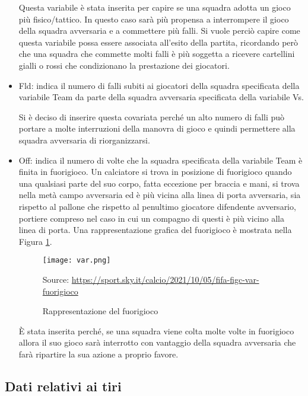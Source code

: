 \begin{itemize}
	Questa variabile è stata inserita per capire se una squadra adotta un gioco più fisico/tattico. In questo caso sarà più propensa a interrompere il gioco della squadra avversaria e a commettere più falli. Si vuole perciò capire come questa variabile possa essere associata all'esito della partita, ricordando però che una squadra che commette molti falli è più soggetta a ricevere cartellini gialli o rossi che condizionano la prestazione dei giocatori.
	\item \textsf{Fld}: indica il numero di falli subiti ai giocatori della squadra specificata della variabile \textsf{Team} da parte della squadra avversaria specificata della variabile \textsf{Vs}. 
	
	Si è deciso di inserire questa covariata perché un alto numero di falli può portare a molte interruzioni della manovra di gioco e quindi permettere alla squadra avversaria di riorganizzarsi.
	
	\item \textsf{Off}: indica il numero di volte che la squadra specificata della variabile \textsf{Team} è finita in fuorigioco. Un calciatore si trova in posizione di fuorigioco quando una qualsiasi parte del suo corpo, fatta eccezione per braccia e mani, si trova nella metà campo avversaria ed è più vicina alla linea di porta avversaria, sia rispetto al pallone che rispetto al penultimo giocatore difendente avversario, portiere compreso nel caso in cui un compagno di questi è più vicino alla linea di porta. Una rappresentazione grafica del fuorigioco è mostrata nella Figura \ref{fig:offside}.
	
	\begin{figure}[!ht]
		\begin{center}
			\texttt{[image: var.png]}
			
			\caption{Rappresentazione del fuorigioco} \label{fig:offside}
			Source: \url{https://sport.sky.it/calcio/2021/10/05/fifa-figc-var-fuorigioco}
		\end{center}
	\end{figure}
	
	È stata inserita perché, se una squadra viene colta molte volte in fuorigioco allora il suo gioco sarà interrotto con vantaggio della squadra avversaria che farà ripartire la sua azione a proprio favore.
	
\end{itemize}

\subsection{Dati relativi ai tiri}

